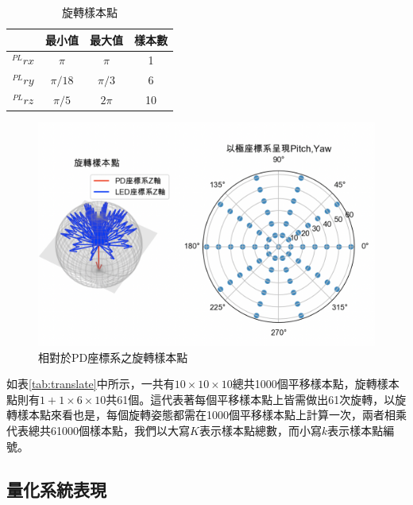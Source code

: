 \begin{table}[htpb]
    \begin{center}
      \caption{旋轉樣本點}
      \label{tab:rotate}
      \begin{tabular}{c|c|c|c} %
        & \textbf{最小值} & \textbf{最大值}&\textbf{樣本數}\\
       \hline
       $^{PL}rx$ & $\pi$ & $\pi$&1\\
       $^{PL}ry$ & $\pi/18$ &$\pi/3$&6\\
       $^{PL}rz$ & $\pi/5$ & $2\pi$&10\\
     \end{tabular}
   \end{center}
 \end{table}

\begin{figure}[htpb]
    \centering
    \includegraphics[width=12cm]{ch4pic/rotate_sample.png}
    \caption{相對於PD座標系之旋轉樣本點}
    \label{pic:rotate_sample}
\end{figure}


如表\ref{tab:translate}中所示，一共有$10\times 10\times 10$總共1000個平移樣本點，旋轉樣本點則有$1+1\times 6\times 10$共61個。這代表著每個平移樣本點上皆需做出61次旋轉，以旋轉樣本點來看也是，每個旋轉姿態都需在1000個平移樣本點上計算一次，兩者相乘代表總共61000個樣本點，我們以大寫$K$表示樣本點總數，而小寫$k$表示樣本點編號。






\subsection{量化系統表現}
\label{chp:evaluate_method}

